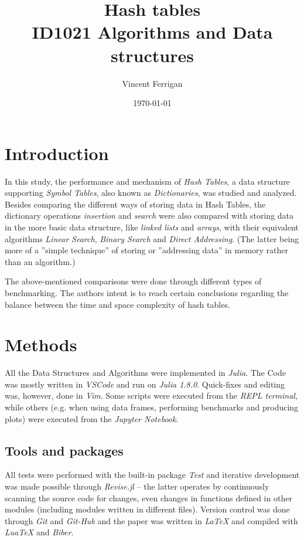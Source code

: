 \documentclass[a4paper, 11pt]{article}
\title{Hash tables\\ \small{ID1021 Algorithms and Data structures}} %
\author{Vincent Ferrigan}
\date{\today}
\begin{document}
    \maketitle
    \section*{Introduction}
    \label{sec:introduction}
    In this study, the performance and mechanism of \emph{Hash Tables}, a 
    data structure supporting \emph{Symbol Tables}, 
    also known as \emph{Dictionaries}, was studied and analyzed.
    Besides comparing the different ways of storing data in Hash Tables,
    the dictionary operations \emph{insertion} and \emph{search} were also compared
    with storing data in the more basic data structure, like \emph{linked lists} and \emph{arrays}, 
    with their equivalent algorithms \emph{Linear Search}, \emph{Binary Search} and 
    \emph{Direct Addressing}. 
    (The latter being more of a ''simple technique'' of storing or
    ''addressing data'' in memory rather than an algorithm.) 
    
    The above-mentioned comparisons were done through different types of benchmarking. 
    The authors intent is to reach certain conclusions regarding 
    the balance between the time and space complexity of hash tables. 

    \section*{Methods}
    \label{sec:methods}
    All the Data Structures and Algorithms were implemented in \emph{Julia}.
    The Code was mostly written in \emph{VSCode} and run on \emph{Julia 1.8.0}.
    Quick-fixes and editing was, however, done in \emph{Vim}. 
    Some scripts were executed from the \emph{REPL terminal},  while others (e.g.
    when using data frames, performing benchmarks and producing plots) 
    were executed from the \emph{Jupyter Notebook}. 
    
    \subsection*{Tools and packages}
    All tests were performed with the built-in package \emph{Test} and 
    iterative development was made possible through 
    \emph{Revise.jl} -- the latter operates by continuously
    scanning the source code for changes, even changes in functions defined in
    other modules (including modules written in different files). 
    Version control was done through \emph{Git} and \emph{Git-Hub} and the paper
    was written in \emph{\LaTeX} and compiled with \emph{LuaTeX} and \emph{Biber}.
    
\end{document}
